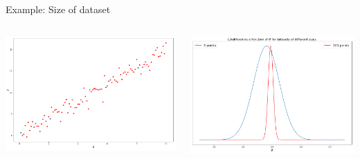 \documentclass[12pt, aspectratio=149]{beamer}
\theoremstyle{plain}
\begin{document}
\begin{frame}[fragile]{Example: Size of dataset}

\begin{columns}
        \begin{center}
             \includegraphics[scale=0.5]{figs/linreg_N_points_example.png} 
        \end{center}
        \begin{center}
            \includegraphics[scale=0.5]{figs/linreg_likelihood_N_example.png}
        \end{center}
\end{columns}



\end{frame}
\end{document}
